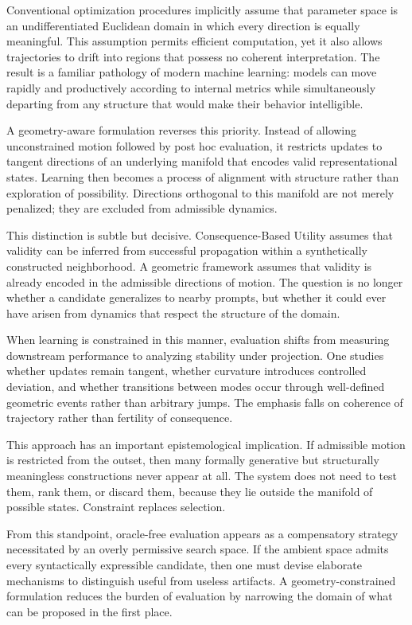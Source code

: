 \documentclass[12pt]{article}
\begin{document}
Conventional optimization procedures implicitly assume that parameter space is an undifferentiated Euclidean domain in which every direction is equally meaningful. This assumption permits efficient computation, yet it also allows trajectories to drift into regions that possess no coherent interpretation. The result is a familiar pathology of modern machine learning: models can move rapidly and productively according to internal metrics while simultaneously departing from any structure that would make their behavior intelligible.

A geometry-aware formulation reverses this priority. Instead of allowing unconstrained motion followed by post hoc evaluation, it restricts updates to tangent directions of an underlying manifold that encodes valid representational states. Learning then becomes a process of alignment with structure rather than exploration of possibility. Directions orthogonal to this manifold are not merely penalized; they are excluded from admissible dynamics.

This distinction is subtle but decisive. Consequence-Based Utility assumes that validity can be inferred from successful propagation within a synthetically constructed neighborhood. A geometric framework assumes that validity is already encoded in the admissible directions of motion. The question is no longer whether a candidate generalizes to nearby prompts, but whether it could ever have arisen from dynamics that respect the structure of the domain.

When learning is constrained in this manner, evaluation shifts from measuring downstream performance to analyzing stability under projection. One studies whether updates remain tangent, whether curvature introduces controlled deviation, and whether transitions between modes occur through well-defined geometric events rather than arbitrary jumps. The emphasis falls on coherence of trajectory rather than fertility of consequence.

This approach has an important epistemological implication. If admissible motion is restricted from the outset, then many formally generative but structurally meaningless constructions never appear at all. The system does not need to test them, rank them, or discard them, because they lie outside the manifold of possible states. Constraint replaces selection.

From this standpoint, oracle-free evaluation appears as a compensatory strategy necessitated by an overly permissive search space. If the ambient space admits every syntactically expressible candidate, then one must devise elaborate mechanisms to distinguish useful from useless artifacts. A geometry-constrained formulation reduces the burden of evaluation by narrowing the domain of what can be proposed in the first place.
\end{document}

